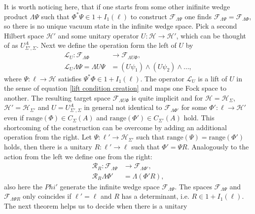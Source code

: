 \documentclass[b5paper,draft,openbib,12pt]{memoir}
\begin{document}
It is worth noticing here, that if one starts from some other
inifinite wedge product \(\mathsf{\Lambda}\Psi\) such that 
\(\Phi^*\Psi \in 1+I_1(\ell)\) to construct 
\(\mathcal{F}_{\mathsf{\Lambda} \Psi}\) one finds 
\(\mathcal{F}_{\mathsf{\Lambda} \Psi}=\mathcal{F}_{\mathsf{\Lambda} \Phi}\),
so there is no unique vacuum state in the infinite wedge space.
Pick a second Hilbert space \(\mathcal{H}'\) and some unitary 
operator \(U:\mathcal{H}\rightarrow \mathcal{H}'\), which 
can be thought of as \(U^A_{\Sigma',\Sigma}\). Next we define 
the operation form the left of \(U\) by 
\begin{align}
  \mathcal{L}_{U}:\mathcal{F}_{\mathsf{\Lambda}\Phi}&\rightarrow \mathcal{F}_{\mathsf{\Lambda}U\Phi}, \\
  \mathcal{L}_U \mathsf{\Lambda}\Psi= \mathsf{\Lambda}U\Psi&= (U\psi_1)\wedge (U\psi_2)\wedge\dots, 
\end{align}
where \(\Psi:\ell\rightarrow \mathcal{H}\) satisfies 
\(\Psi^*\Phi\in 1+I_1(\ell)\). The operator \(\mathcal{L}_U\)
is a lift of \(U\) in the sense of equation 
\eqref{lift condition creation} and maps one Fock space 
to another. 
The resulting target space 
\(\mathcal{F}_{\mathsf{\Lambda}U\Phi}\) is quite implicit 
and for \(\mathcal{H}=\mathcal{H}_{\Sigma}\),
\(\mathcal{H}'=\mathcal{H}_{\Sigma'}\) and 
\(U=U^A_{\Sigma',\Sigma}\) in general not identical to 
\(\mathcal{F}_{\mathsf{\Lambda}\Phi'}\) for some 
\(\Phi':\ell \rightarrow \mathcal{H}'\) even if 
\(\mathrm{range}(\Phi)\in C_\Sigma(A) \) and 
\(\mathrm{range}(\Phi')\in C_{\Sigma'}(A)\) hold. 
This shortcoming of the construction can be overcome 
by adding an additional operation from the right.
Let \(\Psi:\ell' \rightarrow \mathcal{H}_{\Sigma'}\) such 
that \(\mathrm{range}(\Psi)=\mathrm{range}(\Phi')\)
holds, then there is a unitary 
\(R:\ell'\rightarrow \ell\) such that 
\(\Phi'=\Psi R\). Analogously to the action from the left
we define one from the right:
\begin{align}
  \mathcal{R}_{R}:\mathcal{F}_{\mathsf{\Lambda}\Psi}&\rightarrow \mathcal{F}_{\mathsf{\Lambda}\Phi'}, \\
  \mathcal{R}_R \mathsf{\Lambda}\Phi'&= \mathsf{\Lambda}(\Phi' R),
\end{align}
also here the \(Phi'\) generate the infinite wedge space 
\(\mathcal{F}_{\mathsf{\Lambda}\Psi}\). The spaces 
\(\mathcal{F}_{\mathsf{\Lambda}\Psi}\) and 
\(\mathcal{F}_{\mathsf{\Lambda}\Psi R}\) only coincides if 
\(\ell'=\ell\) and
\(R\) has a determinant, i.e. \(R\in 1+I_1(\ell)\). The next
theorem helps us to decide when there is a unitary 
\end{document}
